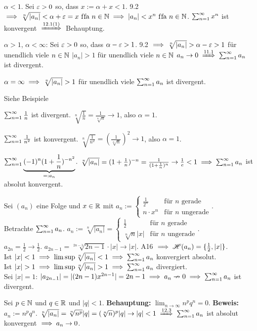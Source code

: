 \documentclass[a4paper,twoside,DIV15,BCOR12mm]{scrbook}
\begin{document}
\begin{beweise}
\item $\alpha < 1 $. Sei $\varepsilon>0$ so, dass $x:= \alpha+x<1$. 9.2 $\implies \sqrt[n]{|a_n|} < \alpha + \varepsilon = x \text{ f\/fa } n\in\mathbb{N} \implies |a_n| < x^n \text{ f\/fa } n\in\mathbb{N}$. $\sum_{n=1}^{\infty}{x^n}$ ist konvergent $\folgtnach{12.1(1)}$ Behauptung.
\item 
 \begin{liste}
 \item $\alpha>1$, $\alpha<\infty$: Sei $\varepsilon>0$ so, dass $\alpha-\varepsilon>1$. 9.2 $\implies \sqrt[n]{|a_n|}>\alpha-\varepsilon>1$ für unendlich viele $n\in\mathbb{N}$ \folgt $|a_n|>1$ für unendlich viele $n\in\mathbb{N}$ \folgt $a_n \to 0 \folgtnach{11.1} \reihe{a_n}$ ist divergent.
 \item $\alpha = \infty \implies \sqrt[n]{|a_n|} > 1$ für unendlich viele \natn {} $\sum_{n=1}^{\infty}{a_n}$ ist divergent.
 \end{liste}
\item Siehe Beispiele
\end{beweise}

\begin{beispiele}
\item $\sum_{n=1}^{\infty}{\frac{1}{n}}$ ist divergent. $\sqrt[n]{\frac{1}{n}} = \frac{1}{\sqrt[n]{n}} \to 1$, also $\alpha = 1$.
\item $\sum_{n=1}^{\infty}{\frac{1}{n^2}}$ ist konvergent. $\sqrt[n]{\frac{1}{n^2}} = (\frac{1}{\sqrt[n]{n}})^2 \to 1$, also $\alpha = 1$.
\item $\sum_{n=1}^{\infty}{\underbrace{(-1)^{n}(1+\frac{1}{n})^{-n^2}}_{=:a_n}}$. $\sqrt[n]{|a_n|} = (1+\frac{1}{n})^{-n} = \frac{1}{(1+\frac{1}{n})^n} \to \frac{1}{e} < 1 \implies \sum_{n=1}^{\infty}{a_n}$ ist absolut konvergent.
\item Sei $(a_n)$ eine Folge und $x\in\mathbb{R}$ mit $a_n:= \begin{cases}\frac{1}{2^n} & \text{für }n\text{ gerade} \\ n\cdot x^n & \text{für }n\text{ ungerade}\end{cases}$. \\
Betrachte $\sum_{n=1}^{\infty}{a_n}$. $a_n := \sqrt[n]{|a_n|} = \begin{cases}\frac{1}{2} &\text{für }n\text{ gerade} \\ \sqrt[n]{n}|x| &\text{für }n\text{ ungerade}\end{cases}$. \\
$a_{2n} = \frac{1}{2} \to \frac{1}{2}$. $a_{2n-1} = \sqrt[2n-1]{2n-1}\cdot|x| \to |x|$. A16 $\implies \mathscr{H}(a_n) = \{\frac{1}{2}, |x|\}$. \\
Ist $|x| < 1 \implies \limsup \sqrt[n]{|a_n|} < 1 \implies \sum_{n=1}^{\infty}{a_n}$ konvergiert absolut.\\
Ist $|x| > 1 \implies \limsup \sqrt[n]{|a_n|} > 1 \implies \sum_{n=1}^{\infty}{a_n}$ divergiert.\\
Sei $|x|=1$: $|a_{2n_-1}| = | (2n-1)x^{2n-1}| = 2n-1 \implies a_n \nrightarrow 0 \implies \sum_{n=1}^{\infty}{a_n}$ ist divergent.
\item Sei $p\in\mathbb{N}$ und $q\in\mathbb{R}$ und $|q|<1$. \textbf{Behauptung:} $\lim_{n\to\infty} n^pq^n=0$. \textbf{Beweis:} $a_n := n^pq^n$. $\sqrt[n]{|a_n|} = \sqrt[n]{n^p}|q| = (\sqrt[n]{n})^p|q| \to |q|<1 \folgtnach{12.3} \reihe{a_n}$ ist absolut konvergent $\implies a_n \to 0$.
\end{beispiele}
\end{document}
